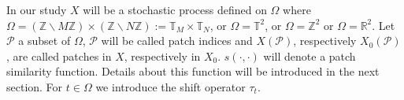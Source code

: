 % 
% 
% 
In our study $X$ will be a stochastic process defined on $\Omega$ where
$\Omega = \left(\mathbb{Z} \backslash M\mathbb{Z} \right) \times \left(
  \mathbb{Z} \backslash N\mathbb{Z} \right) := \mathbb{T}_M \times
\mathbb{T}_N$, or $\Omega = \mathbb{T}^2$, or $\Omega = \mathbb{Z}^2$ or
$\Omega = \mathbb{R}^2$. Let $\mathcal{P}$ a subset of $\Omega$, $\mathcal{P}$
will be called patch indices and $X(\mathcal{P})$, respectively
$X_0(\mathcal{P})$, are called patches in $X$, respectively in
$X_0$. $s(\cdot,\cdot)$ will denote a patch similarity function.  Details about
this function will be introduced in the next section. For $t \in \Omega$ we
introduce the shift operator $\tau_t$.

